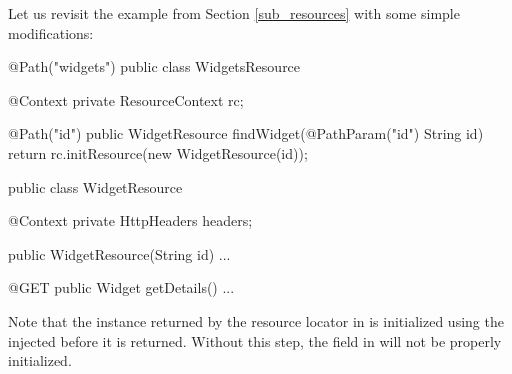 Let us revisit the example from Section \ref{sub_resources} with some simple modifications:

\begin{listing}{1}
@Path("widgets")
public class WidgetsResource {
  @Context 
  private ResourceContext rc;
  
  @Path("{id}")
  public WidgetResource findWidget(@PathParam("id") String id) {
    return rc.initResource(new WidgetResource(id));
  }
}

public class WidgetResource {
  @Context 
  private HttpHeaders headers;

  public WidgetResource(String id) {...}

  @GET
  public Widget getDetails() {...}
}
\end{listing}

Note that the instance returned by the resource locator  in  is initialized using the injected  before it is returned. Without this step, the  field in  will not be properly initialized.
